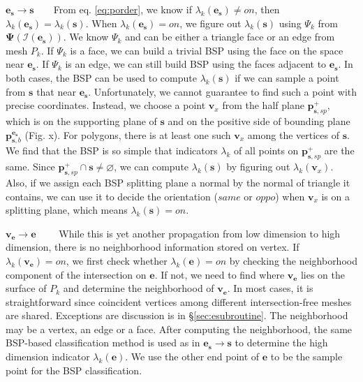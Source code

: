 \documentclass[10pt,journal,compsoc]{IEEEtran}
\begin{document}
\vspace{0.5em}
\noindent\textbf{$\bm{\bm{e}_{\bm{s}}\to \bm{s}}$}~~~~From eq. \ref{eq:porder}, we know if $\lambda_k(\bm{e}_{\bm{s}}) \neq on$, then $\lambda_k(\bm{e}_{\bm{s}})=\lambda_k(\bm{s})$. When $\lambda_k(\bm{e}_{\bm{s}}) = on$, we figure out $\lambda_k(\bm{s})$ using $\Psi_k$ from $\bm{\Psi}(\bm{\mathcal{I}}(\bm{e}_{\bm{s}}))$. We know $\Psi_k$ and can be either a triangle face or an edge from mesh $P_k$. If $\Psi_k$ is a face, we can build a trivial BSP \cite{thibault1987set} using the face on the space near $\bm{e}_{\bm{s}}$. If $\Psi_k$ is an edge, we can still build BSP using the faces adjacent to $\bm{e}_{\bm{s}}$. In both cases, the BSP can be used to compute $\lambda_k(\bm{s})$ if we can sample a point from $\bm{s}$ that near $\bm{e}_{\bm{s}}$. Unfortunately, we cannot guarantee to find such a point with precise coordinates. Instead, we choose a point $\bm{v}_x$ from the half plane $\bm{p}_{\bm{s}, sp}^+$, which is on the supporting plane of $\bm{s}$ and on the positive side of bounding plane $\bm{p}_{\bm{s}, b}^{\bm{e}_{\bm{s}}}$ (Fig. x). For polygons, there is at least one such $\bm{v}_x$ among the vertices of $\bm{s}$. We find that the BSP is so simple that indicators $\lambda_k$ of all points on $\bm{p}_{\bm{s}, sp}^+$ are the same. Since $\bm{p}_{\bm{s}, sp}^+ \cap \bm{s} \neq \varnothing$, we can compute $\lambda_k(\bm{s})$ by figuring out $\lambda_k(\bm{v}_x)$. Also, if we assign each BSP splitting plane a normal by the normal of triangle it contains, we can use it to decide the orientation ($same$ or $oppo$) when $\bm{v}_x$ is on a splitting plane, which means $\lambda_k(\bm{s})=on$.

\vspace{0.5em}
\noindent\textbf{$\bm{\bm{v}_{\bm{e}}\to e}$}~~~~ While this is yet another propagation from low dimension to high dimension, there is no neighborhood information stored on vertex. If $\lambda_k(\bm{v}_{\bm{e}})=on$, we first check whether $\lambda_k(\bm{e}) = on$ by checking the neighborhood component of the intersection on $\bm{e}$. If not, we need to find where $\bm{v}_{\bm{e}}$ lies on the surface of $P_k$ and determine the neighborhood of $\bm{v}_{\bm{e}}$. In most cases, it is straightforward since coincident vertices among different intersection-free meshes are shared. Exceptions are discussion is in \S\ref{sec:esubroutine}. The neighborhood may be a vertex, an edge or a face. After computing the neighborhood, the same BSP-based classification method is used as in ${\bm{e}_{\bm{s}}\to \bm{s}}$ to determine the high dimension indicator $\lambda_k(\bm{e})$. We use the other end point of $\bm{e}$ to be the sample point for the BSP classification.
\end{document}
